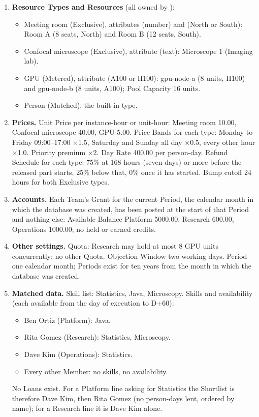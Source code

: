 \begin{enumerate}
  \item \textbf{Resource Types and Resources} (all owned by ):
    \begin{itemize}
      \item Meeting room (Exclusive), attributes  (number) and  (North or South): Room A (8 seats, North) and Room B (12 seats, South).
      \item Confocal microscope (Exclusive), attribute  (text): Microscope 1 (Imaging lab).
      \item GPU (Metered), attribute  (A100 or H100): gpu-node-a (8 units, H100) and gpu-node-b (8 units, A100); Pool Capacity 16 units.
      \item Person (Matched), the built-in type.
    \end{itemize}
  \item \textbf{Prices.} Unit Price per instance-hour or unit-hour: Meeting room 10.00, Confocal microscope 40.00, GPU 5.00. Price Bands for each type: Monday to Friday 09:00--17:00 $\times$1.5, Saturday and Sunday all day $\times$0.5, every other hour $\times$1.0. Priority premium $\times$2. Day Rate 400.00 per person-day. Refund Schedule for each type: 75\% at 168 hours (seven days) or more before the released part starts, 25\% below that, 0\% once it has started. Bump cutoff 24 hours for both Exclusive types.
  \item \textbf{Accounts.} Each Team's Grant for the current Period, the calendar month in which the database was created, has been posted at the start of that Period and nothing else: Available Balance Platform 5000.00, Research 600.00, Operations 1000.00; no held or earned credits.
  \item \textbf{Other settings.} Quota: Research may hold at most 8 GPU units concurrently; no other Quota. Objection Window two working days. Period one calendar month; Periods exist for ten years from the month in which the database was created.
  \item \textbf{Matched data.} Skill list: Statistics, Java, Microscopy. Skills and availability (each available from the day of execution to D+60):
    \begin{itemize}
      \item Ben Ortiz (Platform): Java.
      \item Rita Gomez (Research): Statistics, Microscopy.
      \item Dave Kim (Operations): Statistics.
      \item Every other Member: no skills, no availability.
    \end{itemize}
    No Loans exist. For a Platform line asking for Statistics the Shortlist is therefore Dave Kim, then Rita Gomez (no person-days lent, ordered by name); for a Research line it is Dave Kim alone.
\end{enumerate}

